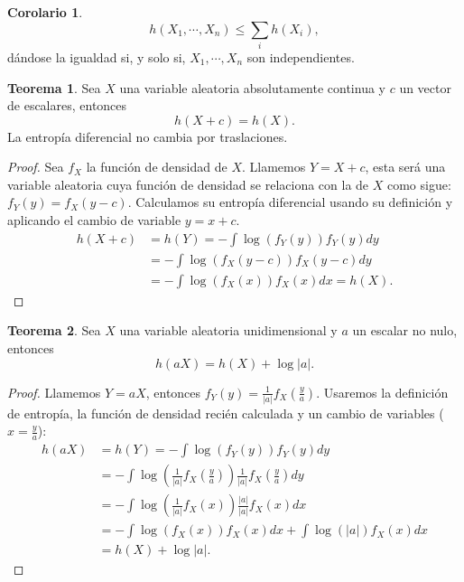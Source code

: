 \documentclass[10pt,a4paper]{article} %
\theoremstyle{definition}
\newtheorem{theorem}{Teorema}[section]
\newtheorem{corollary}{Corolario}[theorem]
\begin{document}
\begin{corollary}
  \[h(X_1,\cdots, X_n) \leq \sum_i h(X_i),\]
  dándose la igualdad si, y solo si, $X_1,\cdots, X_n$ son independientes.
\end{corollary}

\begin{theorem}
  Sea $X$ una variable aleatoria absolutamente continua y $c$ un vector de escalares, entonces
  \[
  h(X+c) = h(X).
  \]
  La entropía diferencial no cambia por traslaciones.
\end{theorem}

\begin{proof}
  Sea $f_X$ la función de densidad de $X$. Llamemos $Y = X+ c$, esta será una variable aleatoria cuya función de densidad se relaciona con la de $X$ como sigue: $f_Y(y)=f_X(y-c)$. Calculamos su entropía diferencial usando su definición y aplicando el cambio de variable $y = x + c$.
  \begin{align*}
    h(X+c) &= h(Y) = - \int \log \left(f_Y(y)\right)f_Y(y) dy\\
    &= - \int  \log \left(f_X(y-c)\right) f_X(y-c) dy\\
    &= - \int  \log \left(f_X(x)\right) f_X(x) dx = h(X).
  \end{align*}
\end{proof}

\begin{theorem}
  Sea $X$ una variable aleatoria unidimensional y $a$ un escalar no nulo, entonces\[
h(aX) = h(X) + \log |a|.
  \]
\end{theorem}

\begin{proof}
  Llamemos $Y = aX$, entonces $f_Y(y) = \frac{1}{|a|}f_X\left (\frac{y}{a} \right )$. Usaremos la definición de entropía, la función de densidad recién calculada y un cambio de variables ($x = \frac{y}{a}$):
  \begin{align*}
    h(aX) &= h(Y) = -\int \log \left(f_Y(y)\right) f_Y(y)dy\\
    &=  -\int \log \left ( \frac{1}{|a|}f_X\left (\frac{y}{a} \right ) \right ) \frac{1}{|a|}f_X\left (\frac{y}{a} \right ) dy\\
    &= -\int  \log \left ( \frac{1}{|a|}f_X\left (x \right ) \right )\frac{|a|}{|a|}f_X\left (x \right ) dx\\
    &= -\int \log \left (f_X\left (x \right ) \right ) f_X\left (x \right ) dx + \int\log\left({|a|}\right) f_X(x)dx\\
    &= h(X) + \log{|a|}.
  \end{align*}
\end{proof}
\end{document}
